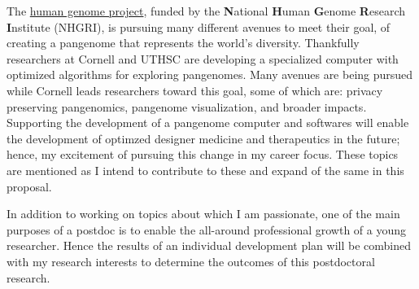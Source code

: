 The \href{https://humanpangenome.org/about-us/}{human genome project}, funded by the \textbf{N}ational \textbf{H}uman \textbf{G}enome \textbf{R}esearch \textbf{I}nstitute (NHGRI), is pursuing many different avenues to meet their goal, of creating a pangenome that represents the world's diversity.  
Thankfully researchers at Cornell and UTHSC are developing a specialized computer with optimized algorithms for exploring pangenomes.
Many avenues are being pursued while Cornell leads researchers toward this goal, some of which are: privacy preserving pangenomics, pangenome visualization, and broader impacts.
Supporting the development of a pangenome computer and softwares will enable the development of optimzed designer medicine and therapeutics in the future; hence, my excitement of pursuing this change in my career focus.
These topics are mentioned as I intend to contribute to these and expand of the same in this proposal.




In addition to working on topics about which I am passionate, one of the main purposes of a postdoc is to enable the all-around professional growth of a young researcher.
Hence the results of an individual development plan will be combined with my research interests to determine the outcomes of this postdoctoral research.